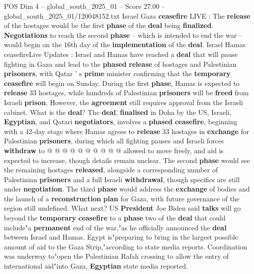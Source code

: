 \begin{textsample}{POS Dim 4 – global\_south\_2025\_01 – Score 27.00 – global\_south\_2025\_01/120048152.txt}  \label{ex:f4_pos_011}
Israel Gaza \textbf{ceasefire} LIVE : The \textbf{release} of the hostages would be the first \textbf{phase} of the \textbf{deal} being \textbf{finalized}. \textbf{Negotiations} to reach the second \textbf{phase} -- which is intended to end the war -- would begin on the 16th day of the \textbf{implementation} of the \textbf{deal}.
Israel Hamas ceasefireLive Updates : Israel and Hamas have reached a \textbf{deal} that will pause fighting in Gaza and lead to the \textbf{phased} \textbf{release} of hostages and Palestinian \textbf{prisoners}, with Qatar ' s \textbf{prime} minister confirming that the \textbf{temporary} \textbf{ceasefire} will begin on Sunday.
During the first \textbf{phase}, Hamas is expected to \textbf{release} 33 hostages, while hundreds of Palestinian \textbf{prisoners} will be \textbf{freed} from Israeli \textbf{prison}.
However, the \textbf{agreement} still requires approval from the Israeli cabinet.
What is the \textbf{deal}?
The \textbf{deal}, \textbf{finalised} in Doha by the US, Israeli, \textbf{Egyptian}, and Qatari \textbf{negotiators}, involves a \textbf{phased} \textbf{ceasefire}, beginning with a 42-day stage where Hamas agrees to \textbf{release} 33 hostages in \textbf{exchange} for Palestinian \textbf{prisoners}, during which all fighting pauses and Israeli forces \textbf{withdraw} to @ @ @ @ @ @ @ @ @ @ allowed to move freely, and aid is expected to increase, though details remain unclear.
The second \textbf{phase} would see the remaining hostages \textbf{released}, alongside a corresponding number of Palestinian \textbf{prisoners} and a full Israeli \textbf{withdrawal}, though specifics are still under \textbf{negotiation}.
The third \textbf{phase} would address the \textbf{exchange} of bodies and the launch of a \textbf{reconstruction} \textbf{plan} for Gaza, with future governance of the region still undefined.
What next?
US \textbf{President} Joe Biden said \textbf{talks} will go beyond the \textbf{temporary} \textbf{ceasefire} to a \textbf{phase} two of the \textbf{deal} that could include"a \textbf{permanent} end of the war,"as he officially announced the \textbf{deal} between Israel and Hamas.
Egypt is"preparing to bring in the largest possible amount of aid to the Gaza Strip,"according to state media reports.
Coordination was underway to"open the Palestinian Rafah crossing to allow the entry of international aid"into Gaza, \textbf{Egyptian} state media reported.

\end{textsample}

